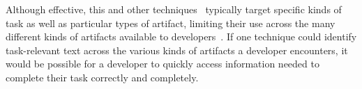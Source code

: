 Although effective, this and other techniques~\cite{Lotufo2012, Ponzanelli2014, nadi2020} typically
target specific kinds of task as well as particular types of artifact, limiting their use across the
many different kinds of artifacts available to developers~\cite{Meyer2017, meyer2019}.
If one technique could identify task-relevant text across the various kinds
of artifacts a developer encounters,
it would be possible for a
developer to quickly access information needed 
to complete their task correctly and completely.





